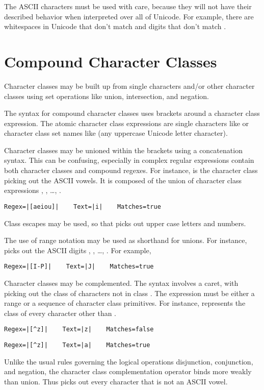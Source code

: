 The ASCII characters must be used with care, because they will not
have their described behavior when interpreted over all of Unicode.
For example, there are whitespaces in Unicode that don't match
 and digits that don't match .

\section{Compound Character Classes}\label{section:compound-char-classes}

Character classes may be built up from single characters and/or other
character classes using set operations like union, intersection, and
negation.

The syntax for compound character classes uses brackets around a
character class expression.  The atomic character class expressions
are single characters like  or character class set names
like  (any uppercase Unicode letter character).

Character classes may be unioned within the brackets using a
concatenation syntax.  This can be confusing, especially in complex
regular expressions contain both character classes and compound regexes.
For instance, \code{[aeiou]} is the character
class picking out the ASCII vowels.  It is composed of the union of
character class expressions , , \ldots, .  
%
\begin{verbatim}
Regex=|[aeiou]|    Text=|i|    Matches=true
\end{verbatim}
%
Class escapes may be used, so that \code{[{\bk}p\{Lu\}{\bk}p\{N\}]}
picks out upper case letters and numbers.

The use of range notation may be used as shorthand for unions.
For instance, \code{[0-9]} picks out the ASCII digits ,
, \ldots, .  For example,
%
\begin{verbatim}
Regex=|[I-P]|    Text=|J|    Matches=true
\end{verbatim}

Character classes may be complemented.  The syntax involves a caret,
with \code{[\^{}\codeVar{A}]} picking out the class of characters not
in class .  The expression  must be either a
range or a sequence of character class primitives.  For instance,
\code{[\^{}z]} represents the class of every character other than
.  
%
\begin{verbatim}
Regex=|[^z]|    Text=|z|    Matches=false
\end{verbatim}
%
\begin{verbatim}
Regex=|[^z]|    Text=|a|    Matches=true
\end{verbatim}
%
Unlike the usual rules governing the logical operations disjunction,
conjunction, and negation, the character class complementation
operator binds more weakly than union.  Thus \code{[\^{}aeiou]} picks
out every character that is not an ASCII vowel.

